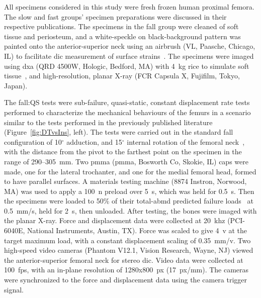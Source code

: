 All specimens considered in this study were fresh frozen human proximal femora.
The slow and fast groups' specimen preparations were discussed in their respective publications.
The specimens in the fall group were cleaned of soft tissue and periosteum, and a white-speckle on black-background pattern was painted onto the anterior-superior neck using an airbrush (VL, Paasche, Chicago, IL) to facilitate \ac{dic} measurement of surface strains~\citep{gilchrist_development_2013}.
The specimens were imaged using \acf{dxa} (QRD 4500W, Hologic, Bedford, MA) with 4~\ac{kg} rice to simulate soft tissue~\citep{sran_accuracy_2004}, and high-resolution, planar X-ray (FCR Capsula X, Fujifilm, Tokyo, Japan).

The fall:\ac{QS} tests were sub-failure, quasi-static, constant displacement rate tests performed to characterize the mechanical behaviours of the femurs in a scenario similar to the tests performed in the previously published literature (Figure~\ref{fig:DTvsIns}, left).
The tests were carried out in the standard fall configuration of 10$ ^\circ $ adduction, and 15$ ^\circ $ internal rotation of the femoral neck~\citep{courtney_effects_1994, de_bakker_during_2009, manske_cortical_2008}, with the distance from the pivot to the farthest point on the specimen in the range of 290--305~\ac{mm}.
Two \acl{pmma} (\acs{pmma}, Bosworth Co, Skokie, IL) caps were made, one for the lateral trochanter, and one for the medial femoral head, formed to have parallel surfaces.
A materials testing machine (8874 Instron, Norwood, MA) was used to apply a 100~\ac{n} preload over 5~\ac{s}, which was held for 0.5~\ac{s}. Then the specimens were loaded to 50\% of their total-\ac{abmd} predicted failure loads~\citep{boehm_prediction_2008} at 0.5~\ac{mm}/\ac{s}, held for 2~\ac{s}, then unloaded.
After testing, the bones were imaged with the planar X-ray.
Force and displacement data were collected at 20~\ac{khz} (PCI-6040E, National Instruments, Austin, TX).
Force was scaled to give 4~\ac{v} at the target maximum load, with a constant displacement scaling of 0.35~\ac{mm}/\ac{v}.
Two high-speed video cameras (Phantom V12.1, Vision Research, Wayne, NJ) viewed the anterior-superior femoral neck for stereo \ac{dic}.
Video data were collected at 100~\ac{fps}, with an in-plane resolution of 1280x800~\ac{px} (17~\ac{px}/\ac{mm}).
The cameras were synchronized to the force and displacement data using the camera trigger signal.

